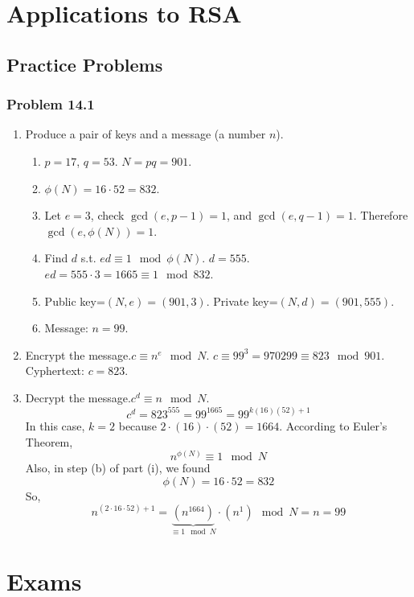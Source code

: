 \documentclass[hidelinks,12pt]{article}
\begin{document}
\section{Applications to RSA}
\subsection{Practice Problems}
\subsubsection{Problem 14.1}
\begin{enumerate}[label=(\roman*)]
    \item Produce a pair of keys and a message (a number $n$).
    \begin{enumerate}[label=(\alph*)]
        \item $p=17$, $q=53$. $N=pq=901$.
        \item $\phi(N)=16\cdot52=832$.
        \item Let $e=3$, check $\gcd(e,p-1)=1$, and $\gcd(e,q-1)=1$. Therefore $\gcd(e,\phi(N))=1$.
        \item Find $d$ s.t. $ed\equiv1\mod{\phi(N)}$. $d=555$.\newline $ed=555\cdot3=1665\equiv1\mod{832}$.
        \item Public key=$(N,e)=(901,3)$. \newline Private key=$(N,d)=(901,555)$.
        \item Message: $n=99$.
    \end{enumerate}
    \item Encrypt the message.\newline $c\equiv n^e\mod{N}$. \newline $c\equiv 99^3=970299\equiv823\mod{901}$. Cyphertext: $c=823$.
    \item Decrypt the message.\newline $c^d\equiv n\mod{N}$. \newline $$c^d=823^{555}=99^{1665}=99^{k(16)(52)+1}$$ In this case, $k=2$ because $2\cdot(16)\cdot(52)=1664$. According to Euler's Theorem, $$n^{\phi(N)}\equiv1\mod{N}$$ Also, in step (b) of part (i), we found $$\phi(N)=16\cdot52=832$$ So, $$n^{(2\cdot16\cdot52)+1}=\underbrace{(n^{1664})}_{\equiv1\mod{N}}\cdot(n^1)\mod{N}=n=99$$
\end{enumerate}
\newpage
\section{Exams}
\end{document}
